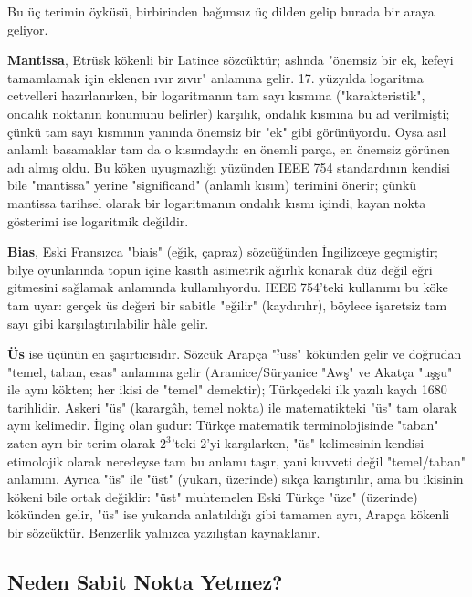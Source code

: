 \begin{bilginot}
Bu üç terimin öyküsü, birbirinden bağımsız üç dilden gelip burada bir araya geliyor.

\textbf{Mantissa}, Etrüsk kökenli bir Latince sözcüktür; aslında "önemsiz bir ek, kefeyi
tamamlamak için eklenen ıvır zıvır" anlamına gelir. 17. yüzyılda logaritma cetvelleri
hazırlanırken, bir logaritmanın tam sayı kısmına ("karakteristik", ondalık noktanın
konumunu belirler) karşılık, ondalık kısmına bu ad verilmişti; çünkü tam sayı kısmının
yanında önemsiz bir "ek" gibi görünüyordu. Oysa asıl anlamlı basamaklar tam da o
kısımdaydı: en önemli parça, en önemsiz görünen adı almış oldu. Bu köken uyuşmazlığı
yüzünden IEEE 754 standardının kendisi bile "mantissa" yerine "significand" (anlamlı
kısım) terimini önerir; çünkü mantissa tarihsel olarak bir logaritmanın ondalık kısmı
içindi, kayan nokta gösterimi ise logaritmik değildir.

\textbf{Bias}, Eski Fransızca "biais" (eğik, çapraz) sözcüğünden İngilizceye geçmiştir;
bilye oyunlarında topun içine kasıtlı asimetrik ağırlık konarak düz değil eğri gitmesini
sağlamak anlamında kullanılıyordu. IEEE 754'teki kullanımı bu köke tam uyar: gerçek üs
değeri bir sabitle "eğilir" (kaydırılır), böylece işaretsiz tam sayı gibi
karşılaştırılabilir hâle gelir.

\textbf{Üs} ise üçünün en şaşırtıcısıdır. Sözcük Arapça "ˀuss" kökünden gelir ve
doğrudan "temel, taban, esas" anlamına gelir (Aramice/Süryanice "Awş" ve Akatça "uşşu"
ile aynı kökten; her ikisi de "temel" demektir); Türkçedeki ilk yazılı kaydı 1680
tarihlidir. Askeri "üs" (karargâh, temel nokta) ile matematikteki "üs" tam olarak aynı
kelimedir. İlginç olan şudur: Türkçe matematik terminolojisinde "taban" zaten ayrı bir
terim olarak $2^3$'teki $2$'yi karşılarken, "üs" kelimesinin kendisi etimolojik olarak
neredeyse tam bu anlamı taşır, yani kuvveti değil "temel/taban" anlamını. Ayrıca "üs"
ile "üst" (yukarı, üzerinde) sıkça karıştırılır, ama bu ikisinin kökeni bile ortak
değildir: "üst" muhtemelen Eski Türkçe "üze" (üzerinde) kökünden gelir, "üs" ise
yukarıda anlatıldığı gibi tamamen ayrı, Arapça kökenli bir sözcüktür. Benzerlik yalnızca
yazılıştan kaynaklanır.
\end{bilginot}

\subsection{Neden Sabit Nokta Yetmez?}
\label{sec:neden-kayan-nokta}

